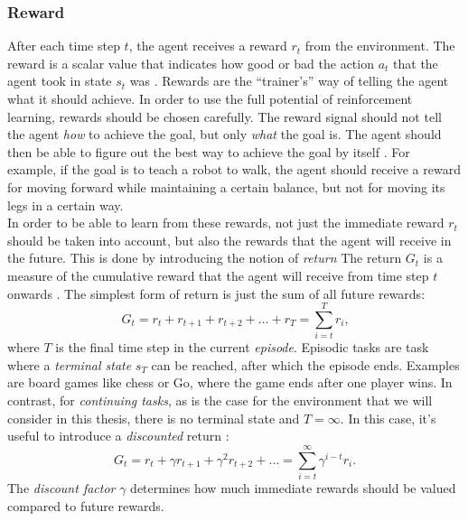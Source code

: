 \subsubsection{Reward}
After each time step $t$, the agent receives a reward $r_t$ from the environment.
The reward is a scalar value that indicates how good or bad the action $a_t$ that the agent took in state $s_t$ was \cite[53]{sutton_reinforcement_nodate}.
Rewards are the \enquote{trainer's} way of telling the agent what it should achieve.
In order to use the full potential of reinforcement learning, rewards should be chosen carefully.
The reward signal should not tell the agent \textit{how} to achieve the goal, but only \textit{what} the goal is.
The agent should then be able to figure out the best way to achieve the goal by itself \cite[ch. 3.2]{sutton_reinforcement_nodate}.
For example, if the goal is to teach a robot to walk, the agent should receive a reward for moving forward while maintaining a certain balance, but not for moving its legs in a certain way.
\\
In order to be able to learn from these rewards, not just the immediate reward $r_t$ should be taken into account, but also the rewards that the agent will receive in the future.
This is done by introducing the notion of \textit{return}
The return $G_t$ is a measure of the cumulative reward that the agent will receive from time step $t$ onwards \cite[ch. 3.3]{sutton_reinforcement_nodate}.
The simplest form of return is just the sum of all future rewards:
\begin{equation}
    G_t = r_t + r_{t+1} + r_{t+2} + \dots + r_{T} = \sum_{i=t}^{T} r_{i} \text{,}
    \label{eq:return}
\end{equation}
where $T$ is the final time step in the current \textit{episode}.
Episodic tasks are task where a \textit{terminal state} $s_T$ can be reached, after which the episode ends.
Examples are board games like chess or Go, where the game ends after one player wins.
In contrast, for \textit{continuing tasks}, as is the case for the environment that we will consider in this thesis, there is no terminal state and $T=\infty$.
In this case, it's useful to introduce a \textit{discounted} return \cite[ch. 3.3]{sutton_reinforcement_nodate}:
\begin{equation}
    G_t = r_t + \gamma r_{t+1} + \gamma^2 r_{t+2} + \dots = \sum_{i=t}^{\infty} \gamma^{i-t} r_{i} \text{.}
    \label{eq:discounted-return}
\end{equation}
The \textit{discount factor} $\gamma$ determines how much immediate rewards should be valued compared to future rewards.

